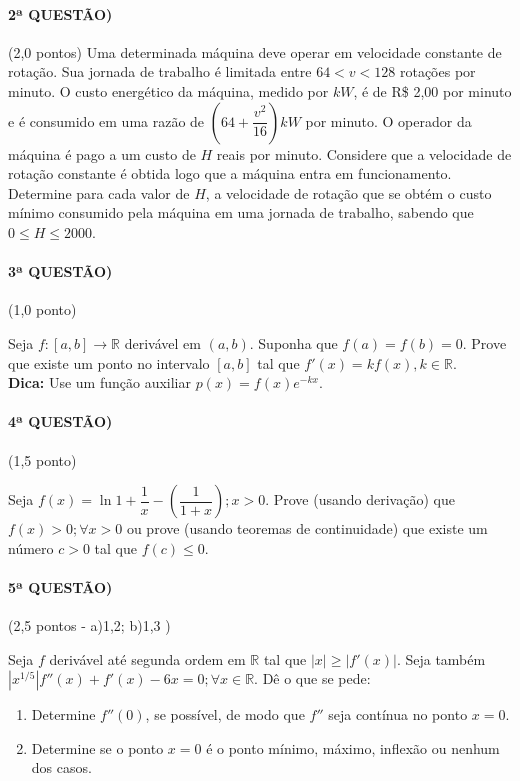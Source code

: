 \documentclass[12pt,a4paper]{article}
\begin{document}
\paragraph{2ª QUESTÃO)} (2,0 pontos)
Uma determinada máquina deve operar em velocidade constante de rotação. Sua jornada de trabalho é limitada entre $64 < v < 128$ rotações por minuto. O custo energético da máquina, medido por $kW$, é de R\$ 2,00 por minuto e é consumido em uma razão de $(64 + \dfrac{v^2}{16})kW$ por minuto. O operador da máquina é pago a um custo de $H$ reais por minuto. Considere que a velocidade de rotação constante é obtida logo que a máquina entra em funcionamento. Determine para cada valor de $H$, a velocidade de rotação que se obtém o custo mínimo consumido pela máquina em uma jornada de trabalho, sabendo que $0 \leq H \leq 2000$.

\newpage

\paragraph{3ª QUESTÃO)} (1,0 ponto)

Seja $f:[a,b] \rightarrow \mathbb{R}$ derivável em $(a,b)$. Suponha que $f(a)=f(b)=0$. Prove que existe um ponto no intervalo $[a,b]$ tal que $f'(x)=kf(x), k \in \mathbb{R}$.\\
\textbf{Dica:} Use um função auxiliar $p(x)=f(x)e^{-kx}$.

\paragraph{4ª QUESTÃO)} (1,5 ponto)

Seja $f(x) = \ln{1 + \dfrac{1}{x}} - \left( \dfrac{1}{1+x} \right); x > 0$.
Prove (usando derivação) que $f(x) > 0; \forall x>0$ ou prove (usando teoremas de continuidade) que existe um número $c>0$ tal que $f(c) \leq 0$.

\paragraph{5ª QUESTÃO)} (2,5 pontos - a)1,2; b)1,3 )

Seja $f$ derivável até segunda ordem em $\mathbb{R}$ tal que $|x| \geq |f'(x)|$.
Seja também $|x^{1/5}| f''(x) + f'(x) -6x=0; \forall x \in \mathbb{R}$.
Dê o que se pede:
\begin{enumerate}[label = (\alph*)]
    \item Determine $f''(0)$, se possível, de modo que $f''$ seja contínua no ponto $x=0$.
    \item Determine se o ponto $x=0$ é o ponto mínimo, máximo, inflexão ou nenhum dos casos.
\end{enumerate}
\end{document}
